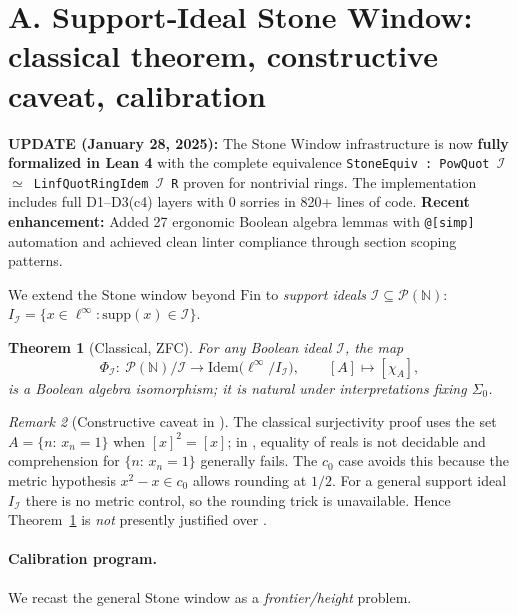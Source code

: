 \documentclass[11pt]{article}
\newtheorem{theorem}{Theorem}[section]
\theoremstyle{definition}
\theoremstyle{remark}
\newtheorem{remark}[theorem]{Remark}
\newcommand{\linf}{\ell^\infty}
\newcommand{\BISH}{\mathrm{BISH}}
\newcommand{\SigmaZero}{\Sigma_{0}}
\begin{document}
\section{A. Support‑Ideal Stone Window: classical theorem, constructive caveat, calibration}

\textbf{UPDATE (January 28, 2025):} The Stone Window infrastructure is now \textbf{fully formalized in Lean 4} with the complete equivalence \texttt{StoneEquiv : PowQuot $\mathcal{I}$ $\simeq$ LinfQuotRingIdem $\mathcal{I}$ R} proven for nontrivial rings. The implementation includes full D1--D3(c4) layers with 0 sorries in 820+ lines of code. \textbf{Recent enhancement:} Added 27 ergonomic Boolean algebra lemmas with \texttt{@[simp]} automation and achieved clean linter compliance through section scoping patterns.

We extend the Stone window beyond $\mathrm{Fin}$ to \emph{support ideals} $\mathcal I\subseteq\mathcal P(\mathbb N)$:
$I_{\mathcal I}=\{x\in\linf:\mathrm{supp}(x)\in\mathcal I\}$.

\begin{theorem}[Classical, ZFC]\label{VI:thm:stone-general-classical}
For any Boolean ideal $\mathcal I$, the map
\[
\Phi_{\mathcal I}: \ \mathcal P(\mathbb N)/\mathcal I \longrightarrow \mathrm{Idem}\big(\linf/I_{\mathcal I}\big),\qquad [A]\mapsto [\chi_A],
\]
is a Boolean algebra isomorphism; it is natural under interpretations fixing $\SigmaZero$.
\end{theorem}

\begin{remark}[Constructive caveat in \BISH]\label{VI:rem:constructive-caveat}
The classical surjectivity proof uses the set $A=\{n:\, x_n=1\}$ when $[x]^2=[x]$; in \BISH, equality of reals is not decidable and comprehension for $\{n:\,x_n=1\}$ generally fails. The $c_0$ case avoids this because the metric hypothesis $x^2-x\in c_0$ allows rounding at $1/2$. For a general support ideal $I_{\mathcal I}$ there is no metric control, so the rounding trick is unavailable. Hence Theorem~\ref{VI:thm:stone-general-classical} is \emph{not} presently justified over \BISH.
\end{remark}

\paragraph{Calibration program.}
We recast the general Stone window as a \emph{frontier/height} problem.
\end{document}
